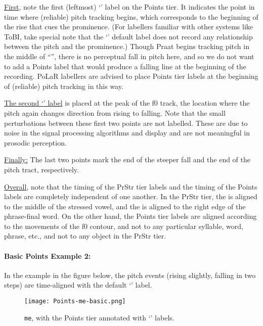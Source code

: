 \uline{First}, note the first (leftmost) ‘’ label on the Points tier. It indicates the point in time where (reliable) pitch tracking begins, which corresponds to the beginning of the rise that cues the prominence. (For labellers familiar with other systems like ToBI, take special note that the ‘’ default label does not record any relationship between the pitch and the prominence.) Though Praat begins tracking pitch in the middle of “”, there is no perceptual fall in pitch here, and so we do not want to add a Points label that would produce a falling line at the beginning of the recording. PoLaR labellers are advised to place Points tier labels at the beginning of (reliable) pitch tracking in this way.

\uline{The second ‘’ label} is placed at the peak of the f0 track, the location where the pitch again changes direction from rising to falling. Note that the small perturbations between these first two points are not labelled. These are due to noise in the signal processing algorithms and display and are not meaningful in prosodic perception.

\uline{Finally:} The last two points mark the end of the steeper fall and the end of the pitch tract, respectively.

\uline{Overall}, note that the timing of the PrStr tier labels and the timing of the Points labels are completely independent of one another. In the PrStr tier, the \textlabel{*} is aligned to the middle of the stressed vowel, and the \textlabel{]} is aligned to the right edge of the phrase-final word. On the other hand, the Points tier labels are aligned according to the movements of the f0 contour, and not to any particular syllable, word, phrase, etc., and not to any object in the PrStr tier.

\paragraph{Basic Points Example 2:\label{basic-points-example-2}}

In the example in the figure below, the pitch events (rising slightly, falling in two steps) are time-aligned with the default ‘’ label.

\begin{figure}[H]
\centering
%
\texttt{[image: Points-me-basic.png]}
%
\caption{\texttt{me}, with the Points tier annotated with ‘’ labels.%
\label{fig:me Points basic}%
%
}
\end{figure}

